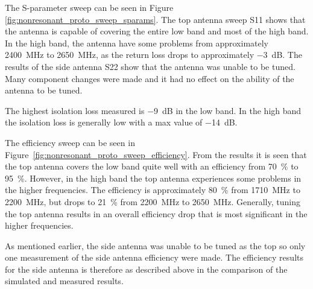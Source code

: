\FloatBarrier
The S-parameter sweep can be seen in Figure \ref{fig:nonresonant_proto_sweep_sparams}. The top antenna sweep S11 shows that the antenna is capable of covering the entire low band and most of the high band. In the high band, the antenna have some problems from approximately \SI{2400}{MHz} to \SI{2650}{MHz}, as the return loss drops to approximately \SI{-3}{dB}. The results of the side antenna S22 show that the antenna was unable to be tuned. Many component changes were made and it had no effect on the ability of the antenna to be tuned. 

The highest isolation loss measured is \SI{-9}{dB} in the low band. In the high band the isolation loss is generally low with a max value of \SI{-14}{dB}. 

The efficiency sweep can be seen in Figure~\ref{fig:nonresonant_proto_sweep_efficiency}. From the results it is seen that the top antenna covers the low band quite well with an efficiency from \SI{70}{\percent} to \SI{95}{\percent}. However, in the high band the top antenna experiences some problems in the higher frequencies. The efficiency is approximately \SI{80}{\percent} from \SI{1710}{MHz} to \SI{2200}{MHz}, but drops to \SI{21}{\percent} from \SI{2200}{MHz} to \SI{2650}{MHz}. Generally, tuning the top antenna results in an overall efficiency drop that is most significant in the higher frequencies.

As mentioned earlier, the side antenna was unable to be tuned as the top so only one measurement of the side antenna efficiency were made. The efficiency results for the side antenna is therefore as described above in the comparison of the simulated and measured results.

